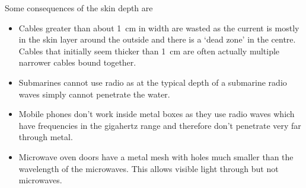     Some consequences of the skin depth are
    \begin{itemize}
        \item Cables greater than about \SI{1}{\centi\meter} in width are wasted as the current is mostly in the skin layer around the outside and there is a `dead zone' in the centre.
        Cables that initially seem thicker than \SI{1}{\centi\meter} are often actually multiple narrower cables bound together.
        \item Submarines cannot use radio as at the typical depth of a submarine radio waves simply cannot penetrate the water.
        \item Mobile phones don't work inside metal boxes as they use radio waves which have frequencies in the gigahertz range and therefore don't penetrate very far through metal.
        \item Microwave oven doors have a metal mesh with holes much smaller than the wavelength of the microwaves.
        This allows visible light through but not microwaves.
    \end{itemize}

